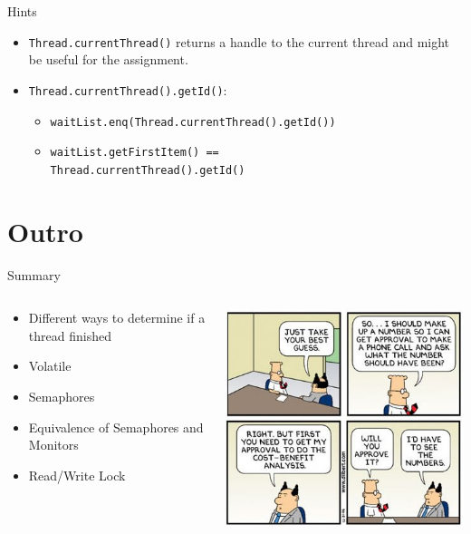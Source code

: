 \begin{frame}{Hints}
  \begin{itemize}
  \item \lstinline!Thread.currentThread()! returns a handle to the
    current thread and might be useful for the assignment.
  \item \lstinline!Thread.currentThread().getId()!:
    \begin{itemize}
    \item \lstinline!waitList.enq(Thread.currentThread().getId())!
    \item \lstinline!waitList.getFirstItem() == !\\
      \lstinline!Thread.currentThread().getId()!
    \end{itemize}
  \end{itemize}
\end{frame}


\section*{Outro}

\begin{frame}{Summary}
  \begin{columns}[c]
    \begin{column}{0.50\textwidth}
      \begin{itemize}
      \item Different ways to determine if a thread finished
      \item Volatile
      \item Semaphores
      \item Equivalence of Semaphores and Monitors
      \item Read/Write Lock
      \end{itemize}
    \end{column}
    \begin{column}{0.50\textwidth}
      \includegraphics[width=\textwidth]{figures/dilbert-cost}
    \end{column}
  \end{columns}
\end{frame}


